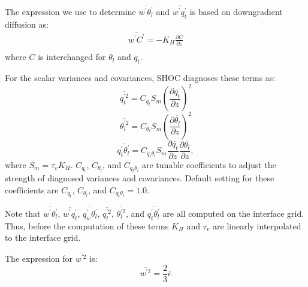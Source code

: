The expression we use to determine $\overline{w^{'}\theta_{l}^{'}}$ and $\overline{w^{'}q_{t}^{'}}$ is based on downgradient diffusion as:
%
\begin{equation}
 \begin{split}
    \overline{w^{'}C^{'}}=-K_{H}\frac{\partial{\overline{C}}}{\partial{z}} \\
  \end{split}
  \label{downgradient4}
\end{equation}
%   
where $C$ is interchanged for $\theta_{l}$ and $q_{t}$.  

For the scalar variances and covariances, SHOC diagnoses these terms as:
%
\begin{equation}
  \overline{q_{t}^{'2}}=C_{q_{t}}S_{m}\left(\frac{\partial{\overline{q_{t}}}}{\partial{z}}\right)^{2}
  \label{bogen_qw2}
\end{equation}
%  
\begin{equation}
  \overline{\theta_{l}^{'2}}=C_{\theta_{l}}S_{m}\left(\frac{\partial{\overline{\theta_{l}}}}{\partial{z}}\right)^{2}
  \label{bogen_thl2}
\end{equation}
%  
\begin{equation}
  \overline{q_{t}^{'}\theta_{l}^{'}}=C_{q_{t}\theta_{l}}S_{m}\frac{\partial{\overline{q_{t}}}}{\partial{z}}\frac{\partial{\overline{\theta_{l}}}}{\partial{z}} , 
  \label{bogen_qwhl2}
\end{equation}
%  
where $S_{m}=\tau_{v} K_{H}$.  $C_{q_{t}}$, $C_{\theta_{l}}$, and $C_{q_{t}\theta_{l}}$ are tunable coefficients to adjust the strength of diagnosed variances and covariances.  Default setting for these coefficients are $C_{q_{t}}$, $C_{\theta_{l}}$, and $C_{q_{t}\theta_{l}}= 1.0$.

Note that $\overline{w^{'}\theta_{l}^{'}}$, $\overline{w^{'}q_{t}^{'}}$, $\overline{q_{w}^{'}\theta_{l}^{'}}$, $\overline{q_{t}^{'2}}$, $\overline{\theta_{l}^{'2}}$, and $\overline{q_{t}^{'}\theta_{l}^{'}}$ are all computed on the interface grid.  Thus, before the computation of these terms $K_{H}$ and $\tau_{v}$ are linearly interpolated to the interface grid.   

The expression for $\overline{w^{'2}}$ is:
%
\begin{equation}
  \overline{w^{'2}}=\frac{2}{3}\overline{e}
  \label{w2_param_2}
\end{equation}
%

